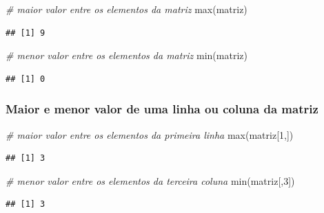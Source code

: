 \documentclass[
]{article}
\newenvironment{Shaded}{\begin{snugshade}}{\end{snugshade}}
\newcommand{\CommentTok}[1]{\textcolor[rgb]{0.56,0.35,0.01}{\textit{#1}}}
\newcommand{\DecValTok}[1]{\textcolor[rgb]{0.00,0.00,0.81}{#1}}
\newcommand{\FunctionTok}[1]{\textcolor[rgb]{0.00,0.00,0.00}{#1}}
\newcommand{\NormalTok}[1]{#1}
\begin{document}
\begin{Shaded}
\begin{Highlighting}[]
\CommentTok{\# maior valor entre os elementos da matriz}
\FunctionTok{max}\NormalTok{(matriz)}
\end{Highlighting}
\end{Shaded}

\begin{verbatim}
## [1] 9
\end{verbatim}

\begin{Shaded}
\begin{Highlighting}[]
\CommentTok{\# menor valor entre os elementos da matriz}
\FunctionTok{min}\NormalTok{(matriz)}
\end{Highlighting}
\end{Shaded}

\begin{verbatim}
## [1] 0
\end{verbatim}

\hypertarget{maior-e-menor-valor-de-uma-linha-ou-coluna-da-matriz}{%
\subsubsection{\texorpdfstring{\textbf{Maior e menor valor de uma linha
ou coluna da
matriz}}{Maior e menor valor de uma linha ou coluna da matriz}}\label{maior-e-menor-valor-de-uma-linha-ou-coluna-da-matriz}}

\begin{Shaded}
\begin{Highlighting}[]
\CommentTok{\# maior valor entre os elementos da primeira linha}
\FunctionTok{max}\NormalTok{(matriz[}\DecValTok{1}\NormalTok{,])}
\end{Highlighting}
\end{Shaded}

\begin{verbatim}
## [1] 3
\end{verbatim}

\begin{Shaded}
\begin{Highlighting}[]
\CommentTok{\# menor valor entre os elementos da terceira coluna}
\FunctionTok{min}\NormalTok{(matriz[,}\DecValTok{3}\NormalTok{])}
\end{Highlighting}
\end{Shaded}

\begin{verbatim}
## [1] 3
\end{verbatim}
\end{document}
